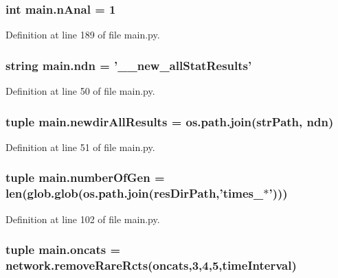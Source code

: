 \hypertarget{a00111_ae7ca1c378927da05feb71e5a9f775afb}{
\subsubsection[{n\-Anal}]{\setlength{\rightskip}{0pt plus 5cm}int main.\-n\-Anal = 1}}\label{a00111_ae7ca1c378927da05feb71e5a9f775afb}


Definition at line 189 of file main.\-py.

\hypertarget{a00111_acaa3f6fffb18a543c7c04d985e77fa6f}{
\subsubsection[{ndn}]{\setlength{\rightskip}{0pt plus 5cm}string main.\-ndn = '\-\_\-\_\-new\-\_\-all\-Stat\-Results'}}\label{a00111_acaa3f6fffb18a543c7c04d985e77fa6f}


Definition at line 50 of file main.\-py.

\hypertarget{a00111_af73b43f5468097ae9443adeb6010a75c}{
\subsubsection[{newdir\-All\-Results}]{\setlength{\rightskip}{0pt plus 5cm}tuple main.\-newdir\-All\-Results = os.\-path.\-join({\bf str\-Path}, {\bf ndn})}}\label{a00111_af73b43f5468097ae9443adeb6010a75c}


Definition at line 51 of file main.\-py.

\hypertarget{a00111_aabf82b9e9c2293000a67162becdd440d}{
\subsubsection[{number\-Of\-Gen}]{\setlength{\rightskip}{0pt plus 5cm}tuple main.\-number\-Of\-Gen = len(glob.\-glob(os.\-path.\-join({\bf res\-Dir\-Path},'times\-\_\-$\ast$')))}}\label{a00111_aabf82b9e9c2293000a67162becdd440d}


Definition at line 102 of file main.\-py.

\hypertarget{a00111_ab4d380bc4bfcb970acc39ddf18a73972}{
\subsubsection[{oncats}]{\setlength{\rightskip}{0pt plus 5cm}tuple main.\-oncats = network.\-remove\-Rare\-Rcts(oncats,3,4,5,{\bf time\-Interval})}}\label{a00111_ab4d380bc4bfcb970acc39ddf18a73972}


